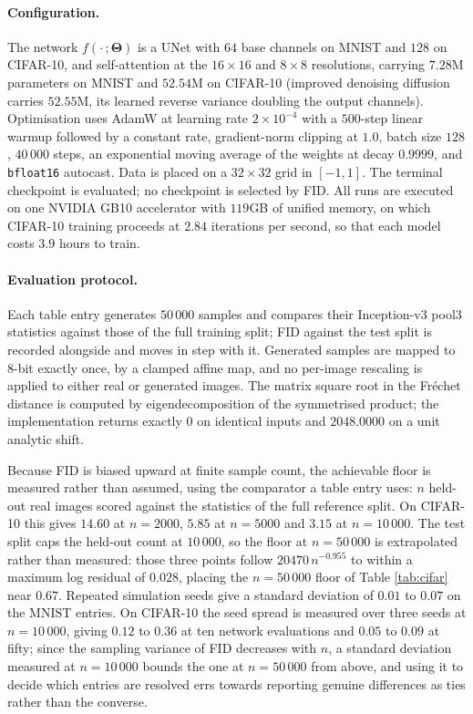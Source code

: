 \paragraph{Configuration.} The network $f(\cdot\,;\boldsymbol{\Theta})$ is a UNet
with $64$ base channels on MNIST and $128$ on CIFAR-10, and self-attention at
the $16\times16$ and $8\times8$
resolutions, carrying $7.28$M parameters on MNIST and $52.54$M on CIFAR-10
(improved denoising diffusion carries $52.55$M, its learned reverse variance
doubling the output channels). Optimisation uses AdamW \cite{adamw2019} at
learning rate $2\times10^{-4}$ with a $500$-step linear warmup followed by a
constant rate, gradient-norm clipping at $1.0$, batch size $128$, $40\,000$
steps, an exponential moving average of the weights at decay $0.9999$, and
\texttt{bfloat16} autocast. Data is placed on a $32\times32$ grid in $[-1,1]$.
The terminal checkpoint is evaluated; no checkpoint is selected by FID. All runs
are executed on one NVIDIA GB10 accelerator with $119$GB of unified memory, on
which CIFAR-10 training proceeds at $2.84$ iterations per second, so that each
model costs $3.9$ hours to train.

\paragraph{Evaluation protocol.} Each table entry generates $50\,000$ samples and
compares their Inception-v3 pool3 statistics against those of the full training
split; FID against the test split is recorded alongside and moves in step with
it. Generated samples are mapped to 8-bit exactly once, by a clamped affine map,
and no per-image rescaling is applied to either real or generated images. The
matrix square root in the Fr\'echet distance is computed by eigendecomposition of
the symmetrised product; the implementation returns exactly $0$ on identical
inputs and $2048.0000$ on a unit analytic shift.

Because FID is biased upward at finite sample count, the achievable floor is
measured rather than assumed, using the comparator a table entry uses: $n$
held-out real images scored against the statistics of the full reference split.
On CIFAR-10 this gives $14.60$ at $n=2000$, $5.85$ at $n=5000$ and $3.15$ at
$n=10\,000$. The test split caps the held-out count at $10\,000$, so the floor at
$n=50\,000$ is extrapolated rather than measured: those three points follow
$20470\,n^{-0.955}$ to within a maximum log residual of $0.028$, placing the
$n=50\,000$ floor of Table \ref{tab:cifar} near $0.67$. Repeated simulation seeds give a standard deviation of $0.01$ to $0.07$
on the MNIST entries. On CIFAR-10 the seed spread is measured over three seeds at
$n=10\,000$, giving $0.12$ to $0.36$ at ten network evaluations and $0.05$ to
$0.09$ at fifty; since the sampling variance of FID decreases with $n$, a
standard deviation measured at $n=10\,000$ bounds the one at $n=50\,000$ from
above, and using it to decide which entries are resolved errs towards reporting
genuine differences as ties rather than the converse.

